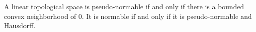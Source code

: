 A linear topological space is pseudo-normable if and only if there is a bounded convex neighborhood of $0$. It is normable if and only if it is pseudo-normable and Hausdorff.
